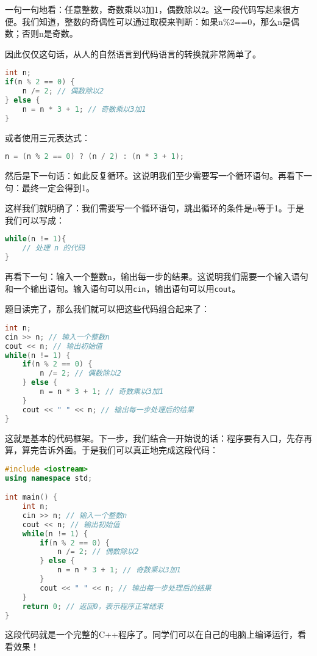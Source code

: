 \begin{answer}
  一句一句地看：任意整数，奇数乘以3加1，偶数除以2。这一段代码写起来很方便。我们知道，整数的奇偶性可以通过取模来判断：如果n\%2==0，那么n是偶数；否则n是奇数。

  因此仅仅这句话，从人的自然语言到代码语言的转换就非常简单了。
\begin{lstlisting}[language=C++]
int n;
if(n % 2 == 0) {
    n /= 2; // 偶数除以2
} else {
    n = n * 3 + 1; // 奇数乘以3加1
}
\end{lstlisting}

  或者使用三元表达式：
\begin{lstlisting}[language=C++]
n = (n % 2 == 0) ? (n / 2) : (n * 3 + 1);
\end{lstlisting}

  然后是下一句话：如此反复循环。这说明我们至少需要写一个循环语句。再看下一句：最终一定会得到1。

  这样我们就明确了：我们需要写一个循环语句，跳出循环的条件是n等于1。于是我们可以写成：
\begin{lstlisting}[language=C++]
while(n != 1){
    // 处理 n 的代码
}
\end{lstlisting}

  再看下一句：输入一个整数n，输出每一步的结果。这说明我们需要一个输入语句和一个输出语句。输入语句可以用\texttt{cin}，输出语句可以用\texttt{cout}。

  题目读完了，那么我们就可以把这些代码组合起来了：
\begin{lstlisting}[language=C++]
int n;
cin >> n; // 输入一个整数n
cout << n; // 输出初始值
while(n != 1) {
    if(n % 2 == 0) {
        n /= 2; // 偶数除以2
    } else {
        n = n * 3 + 1; // 奇数乘以3加1
    }
    cout << " " << n; // 输出每一步处理后的结果
}
\end{lstlisting}
  这就是基本的代码框架。下一步，我们结合一开始说的话：程序要有入口，先存再算，算完告诉外面。于是我们可以真正地完成这段代码：
\begin{lstlisting}[language=C++]
#include <iostream>
using namespace std;

int main() {
    int n;
    cin >> n; // 输入一个整数n
    cout << n; // 输出初始值
    while(n != 1) {
        if(n % 2 == 0) {
            n /= 2; // 偶数除以2
        } else {
            n = n * 3 + 1; // 奇数乘以3加1
        }
        cout << " " << n; // 输出每一步处理后的结果
    }
    return 0; // 返回0，表示程序正常结束
}
\end{lstlisting}
  这段代码就是一个完整的C++程序了。同学们可以在自己的电脑上编译运行，看看效果！
\end{answer}

